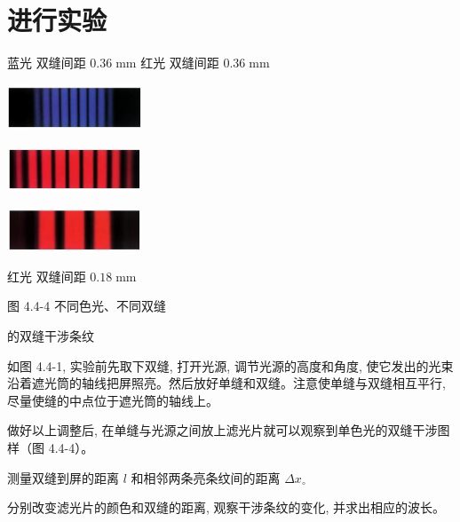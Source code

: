 \documentclass[10pt]{article}
\begin{document}
\section*{进行实验}

蓝光 双缝间距 \({0.36}\mathrm{\;{mm}}\) 红光 双缝间距 \({0.36}\mathrm{\;{mm}}\)

\begin{mdframed}

\begin{center}
\includegraphics[max width=0.3\textwidth]{images/01910e4c-ebb8-7d2c-8f2f-2375bc1d2d12_107_213798.jpg}
\end{center}

\begin{center}
\includegraphics[max width=0.3\textwidth]{images/01910e4c-ebb8-7d2c-8f2f-2375bc1d2d12_107_573277.jpg}
\end{center}

\begin{center}
\includegraphics[max width=0.3\textwidth]{images/01910e4c-ebb8-7d2c-8f2f-2375bc1d2d12_107_320527.jpg}
\end{center}

红光 双缝间距 \({0.18}\mathrm{\;{mm}}\)

图 4.4-4 不同色光、不同双缝

的双缝干涉条纹

\end{mdframed}

如图 4.4-1, 实验前先取下双缝, 打开光源, 调节光源的高度和角度, 使它发出的光束沿着遮光筒的轴线把屏照亮。然后放好单缝和双缝。注意使单缝与双缝相互平行, 尽量使缝的中点位于遮光筒的轴线上。

做好以上调整后, 在单缝与光源之间放上滤光片就可以观察到单色光的双缝干涉图样（图 4.4-4）。

测量双缝到屏的距离 \(l\) 和相邻两条亮条纹间的距离 \(\Delta {x}_{ \circ }\)

分别改变滤光片的颜色和双缝的距离, 观察干涉条纹的变化, 并求出相应的波长。
\end{document}
